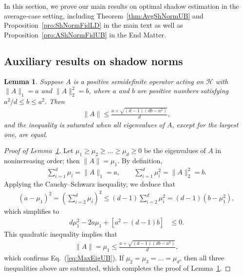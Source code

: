 \documentclass[aps,pra,twocolumn,nofootinbib,superscriptaddress,10pt]{revtex4-2}
\newtheorem{lemma}{Lemma}
\newcommand{\caH}{\mathcal{H}}
\newcommand{\eref}[1]{Eq.~\textup{(\ref{#1})}}
\newcommand{\lref}[1]{Lemma~\ref{#1}}
\newcommand{\pref}[1]{Proposition~\ref{#1}}
\newcommand{\thref}[1]{Theorem~\ref{#1}}
\begin{document}
In this section, we prove our  main results on optimal shadow estimation in the average-case setting, including  \thref{thm:AvgShNormUB}  and \pref{pro:ShNormFidLD} in the main text  as well as \pref{pro:AShNormFidUB} in the End Matter. 

\subsection{Auxiliary results on shadow norms}
\begin{lemma}
\label{lem:MaxEigUB}
Suppose $A$ is a positive semidefinite operator acting on $\caH$ with $\|A\|_1 = a$ and $\|A\|_2^2 = b$, where $a$ and $b$ are positive numbers satisfying ${a^2}/{d}\le b \le a^2$. Then
\begin{align}
\|A\|\leq\frac{a + \sqrt{(d-1)(db - a^2)}}{d}, \label{eq:MaxEigUB}
\end{align}
and the inequality is saturated when all eigenvalues of $A$, except for the largest one, are equal.
\end{lemma}
\begin{proof}[Proof of \lref{lem:MaxEigUB}]
Let $\mu_1 \ge \mu_2 \ge \dots \ge \mu_d \ge 0$ be the eigenvalues of $A$ in nonincreasing order; then $\|A\|= \mu_1$. By definition,
\begin{align}
\sum_{i=1}^d \mu_i =\|A\|_1= a,\quad  \quad \sum_{i=1}^d \mu_i^2 =\|A\|_2^2= b.
\end{align}
Applying the Cauchy--Schwarz inequality, we deduce that
\begin{align}
(a - \mu_1)^2=\left( \sum_{i=2}^d \mu_i \right)^2 \le (d-1) \sum_{i=2}^d \mu_i^2=(d-1)\left(b - \mu_1^2\right),
\end{align}
which simplifies to
\begin{align}
d\mu_1^2 - 2a\mu_1 + \left[a^2 - (d-1)b\right] &\le 0.
\end{align}
This quadratic inequality implies that
\begin{align}
\|A\|=\mu_1\le \frac{a + \sqrt{(d-1)(db - a^2)}}{d},
\end{align}
which confirms \eref{eq:MaxEigUB}. If $\mu_2 = \mu_3 = \dots = \mu_d$, then all three inequalities above are saturated, which completes the proof of \lref{lem:MaxEigUB}.
\end{proof}
\end{document}
